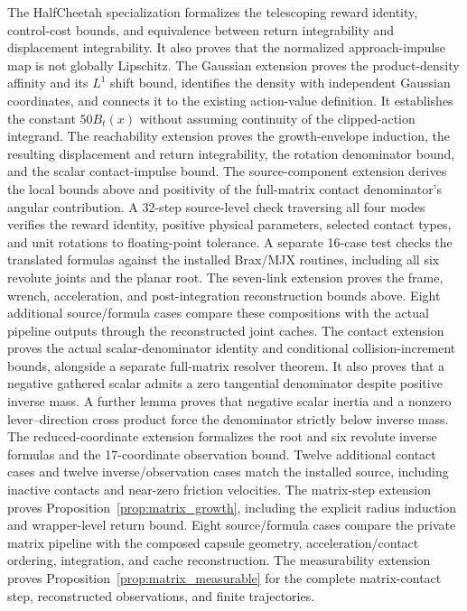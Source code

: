 The HalfCheetah specialization formalizes the telescoping reward identity, control-cost bounds, and equivalence between return integrability and displacement integrability. It also proves that the normalized approach-impulse map is not globally Lipschitz.
The Gaussian extension proves the product-density affinity and its $L^1$ shift bound, identifies the density with independent Gaussian coordinates, and connects it to the existing action-value definition.
It establishes the constant $50B_t(x)$ without assuming continuity of the clipped-action integrand.
The reachability extension proves the growth-envelope induction, the resulting displacement and return integrability, the rotation denominator bound, and the scalar contact-impulse bound.
The source-component extension derives the local bounds above and positivity of the full-matrix contact denominator's angular contribution.
A 32-step source-level check traversing all four modes verifies the reward identity, positive physical parameters, selected contact types, and unit rotations to floating-point tolerance.
A separate 16-case test checks the translated formulas against the installed Brax/MJX routines, including all six revolute joints and the planar root.
The seven-link extension proves the frame, wrench, acceleration, and post-integration reconstruction bounds above.
Eight additional source/formula cases compare these compositions with the actual pipeline outputs through the reconstructed joint caches.
The contact extension proves the actual scalar-denominator identity and conditional collision-increment bounds, alongside a separate full-matrix resolver theorem.
It also proves that a negative gathered scalar admits a zero tangential denominator despite positive inverse mass.
A further lemma proves that negative scalar inertia and a nonzero lever--direction cross product force the denominator strictly below inverse mass.
The reduced-coordinate extension formalizes the root and six revolute inverse formulas and the 17-coordinate observation bound.
Twelve additional contact cases and twelve inverse/observation cases match the installed source, including inactive contacts and near-zero friction velocities.
The matrix-step extension proves Proposition~\ref{prop:matrix_growth}, including the explicit radius induction and wrapper-level return bound.
Eight source/formula cases compare the private matrix pipeline with the composed capsule geometry, acceleration/contact ordering, integration, and cache reconstruction.
The measurability extension proves Proposition~\ref{prop:matrix_measurable} for the complete matrix-contact step, reconstructed observations, and finite trajectories.
